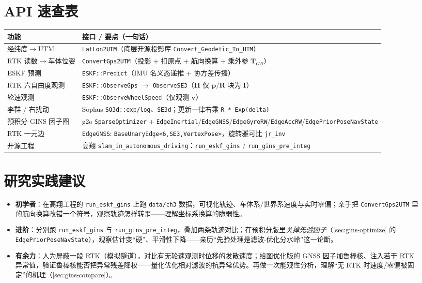 \section*{API 速查表}
\begin{table}[H]\centering\small
\begin{tabular}{p{} p{}}
\toprule
功能 & 接口 / 要点（一句话） \\
\midrule
经纬度$\to$UTM & \texttt{LatLon2UTM}（底层开源投影库 \texttt{Convert\_Geodetic\_To\_UTM}） \\
RTK 读数$\to$车体位姿 & \texttt{ConvertGps2UTM}（投影 + 扣原点 + 航向换算 + 乘外参 $\mathbf{T}_{GB}$） \\
ESKF 预测 & \texttt{ESKF::Predict}（IMU 名义态递推 + 协方差传播） \\
RTK 六自由度观测 & \texttt{ESKF::ObserveGps} $\to$ \texttt{ObserveSE3}（$\mathbf{H}$ 仅 $\mathbf{p}/\mathbf{R}$ 块为 $\mathbf{I}$） \\
轮速观测 & \texttt{ESKF::ObserveWheelSpeed}（仅观测 $\mathbf{v}$） \\
李群 / 右扰动 & Sophus \texttt{SO3d::exp/\allowbreak log}、\texttt{SE3d}；更新一律右乘 \texttt{R * Exp(delta)} \\
预积分 GINS 因子图 & g2o \texttt{SparseOptimizer} + \texttt{EdgeInertial}/\allowbreak\texttt{EdgeGNSS}/\allowbreak\texttt{EdgeGyroRW}/\allowbreak\texttt{EdgeAccRW}/\allowbreak\texttt{EdgePriorPoseNavState} \\
RTK 一元边 & \texttt{EdgeGNSS}: \texttt{BaseUnaryEdge<6,SE3,VertexPose>}，旋转雅可比 \texttt{jr\_inv} \\
开源工程 & 高翔 \texttt{slam\_in\_autonomous\_driving}：\texttt{run\_eskf\_gins} / \texttt{run\_gins\_pre\_integ} \\
\bottomrule
\end{tabular}
\end{table}

\section*{研究实践建议}
\begin{itemize}
  \item \textbf{初学者}：在高翔工程的 \texttt{run\_eskf\_gins} 上跑 \texttt{data/ch3} 数据，可视化轨迹、车体系/世界系速度与实时零偏；亲手把 \texttt{ConvertGps2UTM} 里的航向换算改错一个符号，观察轨迹怎样转歪——理解坐标系换算的脆弱性。
  \item \textbf{进阶}：分别跑 \texttt{run\_eskf\_gins} 与 \texttt{run\_gins\_pre\_integ}，叠加两条轨迹对比；在预积分版里\emph{关掉先验因子}（\cref{sec:gins-optimize} 的 \texttt{EdgePriorPoseNavState}），观察估计变“硬”、平滑性下降——亲历“先验处理是滤波-优化分水岭”这一论断。
  \item \textbf{有余力}：人为屏蔽一段 RTK（模拟隧道），对比有无轮速观测时位移的发散速度；给图优化版的 GNSS 因子加鲁棒核、注入若干 RTK 异常值，验证鲁棒核能否把异常残差降权——量化优化相对滤波的抗异常优势。再做一次能观性分析，理解“无 RTK 时速度/零偏被固定”的机理（\cref{sec:gins-compare}）。
\end{itemize}

